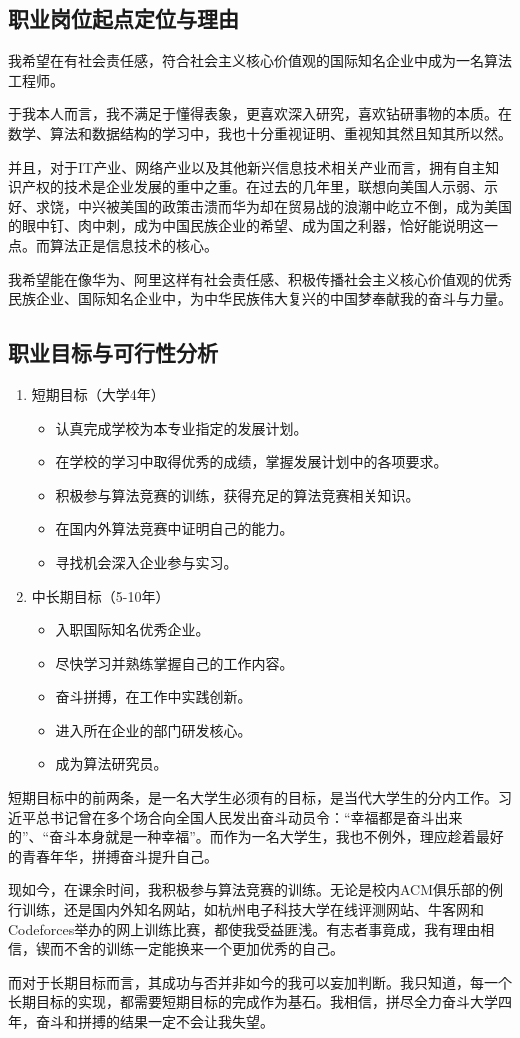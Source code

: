 \documentclass{article}
\begin{document}
\subsection{职业岗位起点定位与理由}
我希望在有社会责任感，符合社会主义核心价值观的国际知名企业中成为一名算法工程师。\par
于我本人而言，我不满足于懂得表象，更喜欢深入研究，喜欢钻研事物的本质。在数学、算法和数据结构的学习中，我也十分重视证明、重视知其然且知其所以然。\par
并且，对于IT产业、网络产业以及其他新兴信息技术相关产业而言，拥有自主知识产权的技术是企业发展的重中之重。在过去的几年里，联想向美国人示弱、示好、求饶，中兴被美国的政策击溃而华为却在贸易战的浪潮中屹立不倒，成为美国的眼中钉、肉中刺，成为中国民族企业的希望、成为国之利器，恰好能说明这一点。而算法正是信息技术的核心。\par
我希望能在像华为、阿里这样有社会责任感、积极传播社会主义核心价值观的优秀民族企业、国际知名企业中，为中华民族伟大复兴的中国梦奉献我的奋斗与力量。
\subsection{职业目标与可行性分析}
\begin{enumerate}[(1)]
	\item {
		短期目标（大学4年）
		\begin{itemize}
			\item {认真完成学校为本专业指定的发展计划。}
			\item {在学校的学习中取得优秀的成绩，掌握发展计划中的各项要求。}
			\item {积极参与算法竞赛的训练，获得充足的算法竞赛相关知识。}
			\item {在国内外算法竞赛中证明自己的能力。}
			\item {寻找机会深入企业参与实习。}
		\end{itemize}
	}
	\item {
		中长期目标（5-10年）
		\begin{itemize}
			\item {入职国际知名优秀企业。}
			\item {尽快学习并熟练掌握自己的工作内容。}
			\item {奋斗拼搏，在工作中实践创新。}
			\item {进入所在企业的部门研发核心。}
			\item {成为算法研究员。}
		\end{itemize}
	}
\end{enumerate}
短期目标中的前两条，是一名大学生必须有的目标，是当代大学生的分内工作。习近平总书记曾在多个场合向全国人民发出奋斗动员令：“幸福都是奋斗出来的”、“奋斗本身就是一种幸福”。而作为一名大学生，我也不例外，理应趁着最好的青春年华，拼搏奋斗提升自己。\par
现如今，在课余时间，我积极参与算法竞赛的训练。无论是校内ACM俱乐部的例行训练，还是国内外知名网站，如杭州电子科技大学在线评测网站、牛客网和Codeforces举办的网上训练比赛，都使我受益匪浅。有志者事竟成，我有理由相信，锲而不舍的训练一定能换来一个更加优秀的自己。\par
而对于长期目标而言，其成功与否并非如今的我可以妄加判断。我只知道，每一个长期目标的实现，都需要短期目标的完成作为基石。我相信，拼尽全力奋斗大学四年，奋斗和拼搏的结果一定不会让我失望。
\end{document}
